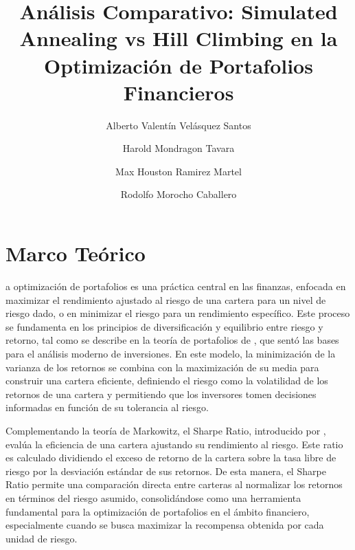 \documentclass[9pt,a4paper,twoside]{rho-class/rho}
\title{ Análisis Comparativo: Simulated Annealing vs Hill Climbing en la Optimización de Portafolios Financieros }
\author[,$\dagger$]{Alberto Valentín Velásquez Santos}
\author[,$\dagger$]{Harold Mondragon Tavara}
\author[,$\dagger$]{Max Houston Ramirez Martel}
\author[,$\dagger$]{Rodolfo Morocho Caballero}
\affil[$\dagger$]{Estos autores contribuyeron igualmente a este trabajo.}
\begin{document}
	
    \maketitle
    \section{Marco Teórico}

        a optimización de portafolios es una práctica central en las finanzas, enfocada en maximizar el rendimiento ajustado al riesgo de una cartera para un nivel de riesgo dado, o en minimizar el riesgo para un rendimiento específico. Este proceso se fundamenta en los principios de diversificación y equilibrio entre riesgo y retorno, tal como se describe en la teoría de portafolios de \cite{Markowitz1952}, que sentó las bases para el análisis moderno de inversiones. En este modelo, la minimización de la varianza de los retornos se combina con la maximización de su media para construir una cartera eficiente, definiendo el riesgo como la volatilidad de los retornos de una cartera y permitiendo que los inversores tomen decisiones informadas en función de su tolerancia al riesgo.

        Complementando la teoría de Markowitz, el Sharpe Ratio, introducido por \cite{Sharpe1966}, evalúa la eficiencia de una cartera ajustando su rendimiento al riesgo. Este ratio es calculado dividiendo el exceso de retorno de la cartera sobre la tasa libre de riesgo por la desviación estándar de sus retornos. De esta manera, el Sharpe Ratio permite una comparación directa entre carteras al normalizar los retornos en términos del riesgo asumido, consolidándose como una herramienta fundamental para la optimización de portafolios en el ámbito financiero, especialmente cuando se busca maximizar la recompensa obtenida por cada unidad de riesgo.
        
\end{document}
